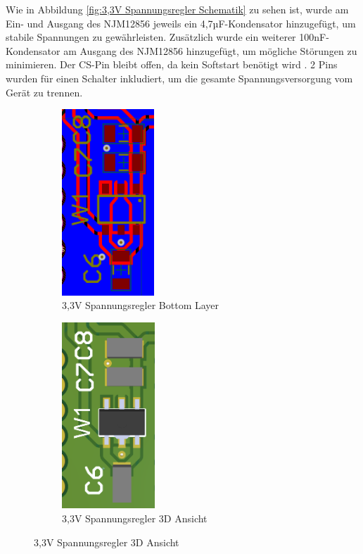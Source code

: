 \begin{inhalt}
Wie in Abbildung \ref{fig:3,3V Spannungsregler Schematik} zu sehen ist, wurde am Ein- und Ausgang des NJM12856 jeweils ein 4,7µF-Kondensator hinzugefügt, um stabile Spannungen zu gewährleisten. Zusätzlich wurde ein weiterer 100nF-Kondensator am Ausgang des NJM12856 hinzugefügt, um mögliche Störungen zu minimieren. Der CS-Pin bleibt offen, da kein Softstart benötigt wird \cite{NJM12856}. 2 Pins wurden für einen Schalter inkludiert, um die gesamte Spannungsversorgung vom Gerät zu trennen. 


\begin{figure}[H] 
  \centering

  \begin{subfigure}[b]{0.48\textwidth}
    \centering
    \includegraphics[height=7cm]{files/Tobias/pics/Schaltungen/PCB/3V3_Spannungregler_PCB.PNG}
    \caption{3,3V Spannungsregler Bottom Layer}
    \label{fig:USB-C_Bottom_layer}
  \end{subfigure}
  \hspace{2mm} %
  \begin{subfigure}[b]{0.48\textwidth}
    \centering
    \includegraphics[height=7cm]{files/Tobias/pics/Schaltungen/PCB/3V3_Spannungsregler_PCB_3D.PNG}
    \caption{3,3V Spannungsregler 3D Ansicht}
    \label{fig:USB-C_3D_Ansicht}
  \end{subfigure}


\end{figure}
\end{inhalt}
